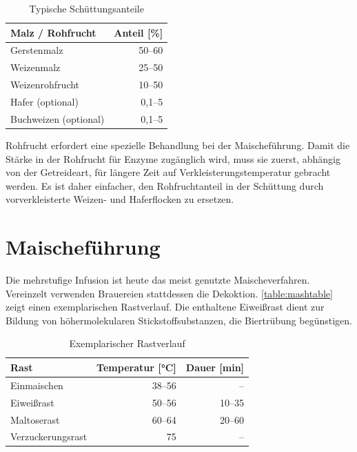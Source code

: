 \documentclass[a4paper,parskip=half]{scrartcl}
\begin{document}
\begin{table}[H]
\centering
\begin{tabular}{lr}
\toprule
Malz / Rohfrucht      & Anteil [\%] \\
\midrule
Gerstenmalz           & 50–60 \\
Weizenmalz            & 25–50 \\
Weizenrohfrucht       & 10–50 \\
Hafer (optional)      & 0,1–5 \\
Buchweizen (optional) & 0,1–5 \\
\bottomrule
\end{tabular}
\caption{Typische Schüttungsanteile \parencite[13]{Strottner1999}}
\label{table:grains}
\end{table}

Rohfrucht erfordert eine spezielle Behandlung bei der Maischeführung. Damit
die Stärke in der Rohfrucht für Enzyme zugänglich wird, muss sie zuerst,
abhängig von der Getreideart, für längere Zeit auf Verkleisterungstemperatur
gebracht werden. Es ist daher einfacher, den Rohfruchtanteil in der Schüttung
durch vorverkleisterte Weizen- und Haferflocken zu ersetzen.

\section*{Maischeführung}

Die mehrstufige Infusion ist heute das meist genutzte Maischeverfahren.
Vereinzelt verwenden Brauereien stattdessen die Dekoktion.  
\autoref{table:mashtable} zeigt einen exemplarischen Rastverlauf. Die enthaltene
Eiweißrast dient zur Bildung von höhermolekularen Stickstoffsubstanzen, die
Biertrübung begünstigen. \parencite[12,16,78]{Strottner1999}

\begin{table}[H]
\centering
\begin{tabular}{lrr}
\toprule
Rast              & Temperatur [°C] & Dauer [min] \\
\midrule
Einmaischen       & 38–56          & –     \\
Eiweißrast        & 50–56          & 10–35 \\
Maltoserast       & 60–64          & 20–60 \\
Verzuckerungsrast & 75             & –     \\
\bottomrule
\end{tabular}
\caption{Exemplarischer Rastverlauf \parencite[16]{Strottner1999}}
\label{table:mashtable}
\end{table}
\end{document}
